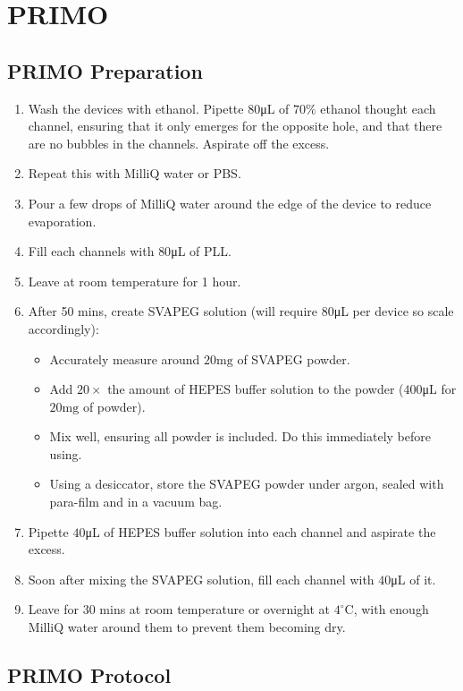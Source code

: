 \section{PRIMO}

\subsection{PRIMO Preparation}

\begin{enumerate}
	 \setlength\itemsep{-0.1em}
	\item Wash the devices with ethanol. Pipette $80  $\unit{\uL} of $70\%$ ethanol thought each channel, ensuring that it only emerges for the opposite hole, and that there are no bubbles in the channels. Aspirate off the excess.
	\item Repeat this with MilliQ water or PBS.
	\item Pour a few drops of MilliQ water around the edge of the device to reduce evaporation.
	\item Fill each channels with $80  $\unit{\uL} of PLL.
	\item Leave at room temperature for 1 hour.
	\item After 50 mins, create SVAPEG solution (will require $80  $\unit{\uL} per device so scale accordingly):
	\begin{itemize}
		 \setlength\itemsep{-0.1em}
		\item Accurately measure around $20  \text{mg}$ of SVAPEG powder.
		\item Add $20 \times$ the amount of HEPES buffer solution to the powder ($400  $\unit{\uL} for $20  \text{mg}$ of powder). 
		\item Mix well, ensuring all powder is included. Do this immediately before using.
		\item Using a desiccator, store the SVAPEG powder under argon, sealed with para-film and in a vacuum bag.
	\end{itemize}
	\item Pipette $40  $\unit{\uL} of HEPES buffer solution into each channel and aspirate the excess.
	\item Soon after mixing the SVAPEG solution, fill each channel with $40  $\unit{\uL} of it.
	\item Leave for 30 mins at room temperature or overnight at $4^{\circ}$C, with enough MilliQ water around them to prevent them becoming dry.
\end{enumerate}

\subsection{PRIMO Protocol}

